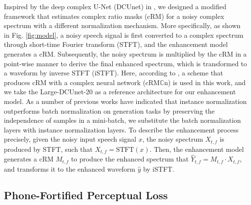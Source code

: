 \documentclass[a4paper]{article}
\begin{document}
Inspired by the deep complex U-Net (DCUnet) in \cite{choi2018phase}, we designed a modified framework that estimates complex ratio masks (cRM) for a noisy complex spectrum with a different normalization mechanism. More specifically, as shown in Fig. \ref{fig:model}, a noisy speech signal is first converted to a complex spectrum through short-time Fourier transform (STFT), and the enhancement model generates a cRM. Subsequently, the noisy spectrum is multiplied by the cRM in a point-wise manner to derive the final enhanced spectrum, which is transformed to a waveform by inverse STFT (iSTFT). Here, according to \cite{choi2018phase}, a scheme that produces cRM with a complex neural network (cRM$\mathbb{C}$n) is used in this work, and we take the Large-DCUnet-20 as a reference architecture for our enhancement model. As a number of previous works \cite{ulyanov2016instance, conf/iccv/HuangB17} have indicated that instance normalization outperforms batch normalization on generation tasks by preserving the independence of samples in a mini-batch, we substitute the batch normalization layers with instance normalization layers. To describe the enhancement process precisely, given the noisy input speech signal $x$, the noisy spectrum $X_{t,f}$ is produced by STFT, such that $X_{t,f} = \mathrm{STFT}(x)$. Then, the enhancement model generates a cRM $M_{t,f}$ to produce the enhanced spectrum that $\hat{Y}_{t,f} = M_{t,f}\cdot X_{t,f}$, and transforms it to the enhanced waveform $\hat{y}$ by iSTFT.
\subsection{Phone-Fortified Perceptual Loss}
\label{ssec:problem_definition}
\end{document}
